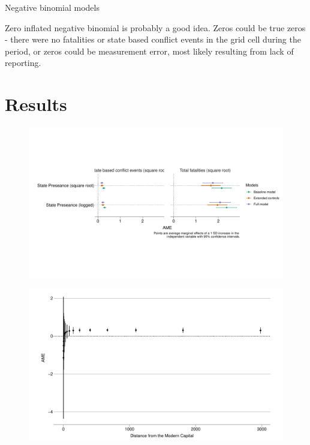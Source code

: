 \documentclass[12pt]{article}
\begin{document}
Negative binomial models

Zero inflated negative binomial is probably a good idea. Zeros could be true
zeros - there were no fatalities or state based conflict events in the grid cell
during the period, or zeros could be measurement error, most likely resulting
from lack of reporting.

\section{Results}

\begin{figure}[htpb]
	\centering
	\includegraphics[width=\linewidth]{"../R/Output/conflictMargins.pdf"}
	\caption{}
	\label{margins}
\end{figure}

\begin{figure}[htpb]
	\centering
	\includegraphics[width=\linewidth]{"../R/Output/deaths_int_plot.pdf"}
	\caption{}
	\label{deaths_int}
\end{figure}
\end{document}
